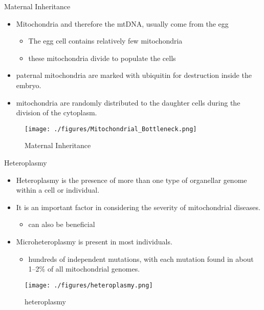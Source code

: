 \documentclass[presentation, smaller]{beamer}
\begin{document}
\begin{frame}[label={sec:org38e893a}]{Maternal Inheritance}
\begin{itemize}
\item Mitochondria and therefore the mtDNA, usually come from the egg
\begin{itemize}
\item The egg cell contains relatively few mitochondria
\item these mitochondria divide to populate the cells
\end{itemize}
\item paternal mitochondria are marked with ubiquitin for destruction
inside the embryo.
\item mitochondria are randomly distributed to the daughter cells during
the division of the cytoplasm.
\end{itemize}

\begin{figure}[htbp]
\centering
\texttt{[image: ./figures/Mitochondrial\_Bottleneck.png]}
\caption[mom]{\label{fig:orgebd9e71}
Maternal Inheritance}
\end{figure}
\end{frame}

\begin{frame}[label={sec:org95f6eab}]{Heteroplasmy}
\begin{itemize}
\item Heteroplasmy is the presence of more than one type of organellar
genome within a cell or individual.

\item It is an important factor in considering the severity of
mitochondrial diseases.
\begin{itemize}
\item can also be beneficial
\end{itemize}

\item Microheteroplasmy is present in most individuals.
\begin{itemize}
\item hundreds of independent mutations, with each mutation found in
about 1–2\% of all mitochondrial genomes.
\end{itemize}
\end{itemize}


\begin{figure}[htbp]
\centering
\texttt{[image: ./figures/heteroplasmy.png]}
\caption[heter]{\label{fig:org83dcf98}
heteroplasmy}
\end{figure}
\end{frame}
\end{document}
